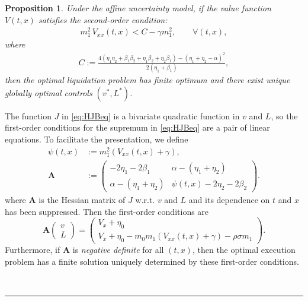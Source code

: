 \documentclass[12pt, letterpaper]{article}
\newtheorem{proposition}[theorem]{Proposition}
\newenvironment{proof}[1][Proof]{\text{#1.} }{\ \rule{0.5em}{0.5em}}
\def\L{{\mathcal L} \,}
\numberwithin{equation}{section}
\numberwithin{theorem}{section}
\begin{document}
\begin{proposition}\label{prop:optcond} Under the affine uncertainty model, if the value function $V(t,x)$ satisfies the  \textit{second-order condition}:
\begin{align}
	m_1^2 \,V_{xx}(t,x)< {{C}-\gamma m_1^2}, \qquad \forall (t,x),\label{optimalcond}
\end{align} where \begin{align}\label{CC}C:= \frac{4(\eta_1\eta_2+\beta_1\beta_2+\eta_1\beta_2+\eta_2\beta_1)-\left(\eta_1+\eta_2-\alpha\right)^2}{2(\eta_1+\beta_1)},\end{align}
  then the optimal liquidation problem has finite optimum and there exist unique globally optimal controls $(v^*, L^*)$.
\end{proposition}
\begin{proof}
 The function $J$  in \eqref{eq:HJBeq} is a bivariate quadratic function in $v$ and $L$, so the first-order conditions for the supremum in  \eqref{eq:HJBeq} are  a pair of linear equations.   To facilitate the presentation, we define   
\begin{align}
\psi(t,x)&:=m_1^2(V_{xx}(t,x)+\gamma),\label{psidef}\\
\textbf{A}&:= \left( \begin{array}{cc}
-2\eta_1-2\beta_1 & \alpha-\left(\eta_1+\eta_2\right) \\
\alpha-\left(\eta_1+\eta_2\right) & \psi(t,x)-2\eta_2-2\beta_2  \end{array} \right). \label{matrixA}
\end{align} 
where $\textbf{A}$ is the Hessian matrix  of $J$ w.r.t. $v$ and $L$ and its dependence on $t$ and $x$ has been suppressed. Then the first-order conditions    are
\[ \textbf{A}\left(\begin{array}{c} v\\L \end{array}\right)=\left(\begin{array}{c} V_x+\eta_0\\ V_x+\eta_0-m_0m_1\left(V_{xx}(t,x)+\gamma\right)-\rho\sigma m_1 \end{array}\right).\]
Furthermore, if $\textbf{A}$ is \emph{negative definite} for all $(t,x)$, then the optimal execution problem has a finite solution uniquely determined by these first-order conditions.


\end{proof}
\end{document}
